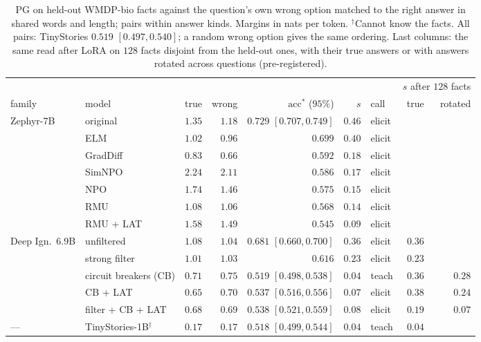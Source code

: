 \documentclass[11pt]{article}
\newcommand{\acc}{\mathrm{acc}^*}
\theoremstyle{definition}
\begin{document}
\begin{table}[h]
\centering
\footnotesize
\setlength{\tabcolsep}{4pt}
\begin{tabular}{llrrrrlrr}
\toprule
 & & & & & & & \multicolumn{2}{c}{$s$ after $128$ facts} \\
family & model & true & wrong & $\acc$ ($95\%$) & $s$ & call & true & rotated \\
\midrule
Zephyr-7B & original & $1.35$ & $1.18$ & $0.729$ $[0.707, 0.749]$ & $0.46$ & elicit & & \\
 & ELM & $1.02$ & $0.96$ & $0.699$ & $0.40$ & elicit & & \\
 & GradDiff & $0.83$ & $0.66$ & $0.592$ & $0.18$ & elicit & & \\
 & SimNPO & $2.24$ & $2.11$ & $0.586$ & $0.17$ & elicit & & \\
 & NPO & $1.74$ & $1.46$ & $0.575$ & $0.15$ & elicit & & \\
 & RMU & $1.08$ & $1.06$ & $0.568$ & $0.14$ & elicit & & \\
 & RMU + LAT & $1.58$ & $1.49$ & $0.545$ & $0.09$ & elicit & & \\
\midrule
Deep Ign.\ 6.9B & unfiltered & $1.08$ & $1.04$ & $0.681$ $[0.660, 0.700]$ & $0.36$ & elicit & $0.36$ & \\
 & strong filter & $1.01$ & $1.03$ & $0.616$ & $0.23$ & elicit & $0.23$ & \\
 & circuit breakers (CB) & $0.71$ & $0.75$ & $0.519$ $[0.498, 0.538]$ & $0.04$ & teach & $0.36$ & $0.28$ \\
 & CB + LAT & $0.65$ & $0.70$ & $0.537$ $[0.516, 0.556]$ & $0.07$ & elicit & $0.38$ & $0.24$ \\
 & filter + CB + LAT & $0.68$ & $0.69$ & $0.538$ $[0.521, 0.559]$ & $0.08$ & elicit & $0.19$ & $0.07$ \\
\midrule
--- & TinyStories-1B$^\dagger$ & $0.17$ & $0.17$ & $0.518$ $[0.499, 0.544]$ & $0.04$ & teach & $0.04$ & \\
\bottomrule
\end{tabular}
\caption{PG on held-out WMDP-bio facts \citep{li2024wmdp,obrien2025deepignorance} against the question's own wrong
option matched to the right answer in shared words and length; pairs within answer kinds. Margins in nats per
token. $^\dagger$Cannot know the facts. All pairs: TinyStories $0.519$ $[0.497, 0.540]$; a random wrong option gives the same ordering. Last columns: the same read
after LoRA on $128$ facts disjoint from the held-out ones, with their true answers or with answers rotated across
questions (pre-registered).}
\label{tab:unlearn}
\end{table}
\end{document}
